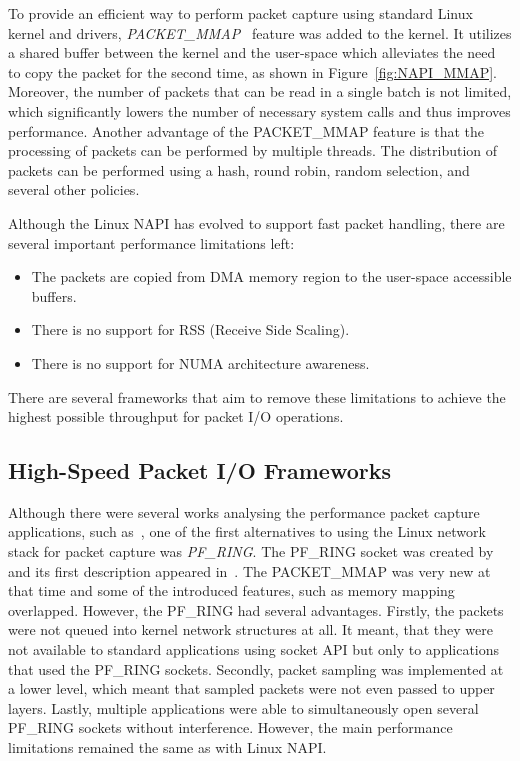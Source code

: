 To provide an efficient way to perform packet capture using standard Linux kernel and drivers, \emph{PACKET\_MMAP}~\cite{LinuxKernelOrganization-2017-PACKETMMAP} feature was added to the kernel. It utilizes a shared buffer between the kernel and the user-space which alleviates the need to copy the packet for the second time, as shown in Figure~\ref{fig:NAPI_MMAP}. Moreover, the number of packets that can be read in a single batch is not limited, which significantly lowers the number of necessary system calls and thus improves performance. Another advantage of the PACKET\_MMAP feature is that the processing of packets can be performed by multiple threads. The distribution of packets can be performed using a hash, round robin, random selection, and several other policies. 

Although the Linux NAPI has evolved to support fast packet handling, there are several important performance limitations left:
\begin{itemize}
  \item The packets are copied from DMA memory region to the user-space accessible buffers.
  \item There is no support for RSS (Receive Side Scaling).
  \item There is no support for NUMA architecture awareness.
\end{itemize}

There are several frameworks that aim to remove these limitations to achieve the highest possible throughput for packet I/O operations.


\subsection{High-Speed Packet I/O Frameworks}

Although there were several works analysing the performance packet capture applications, such as~\cite{Degioanni-2003-Profiling}, one of the first alternatives to using the Linux network stack for packet capture was \emph{PF\_RING}. The PF\_RING socket was created by \citeauthor{Deri-2004-Improving} and its first description appeared in~\cite{Deri-2004-Improving}. The PACKET\_MMAP was very new at that time and some of the introduced features, such as memory mapping overlapped. However, the PF\_RING had several advantages. Firstly, the packets were not queued into kernel network structures at all. It meant, that they were not available to standard applications using socket API but only to applications that used the PF\_RING sockets. Secondly, packet sampling was implemented at a lower level, which meant that sampled packets were not even passed to upper layers. Lastly, multiple applications were able to simultaneously open several PF\_RING sockets without interference. However, the main performance limitations remained the same as with Linux NAPI.

